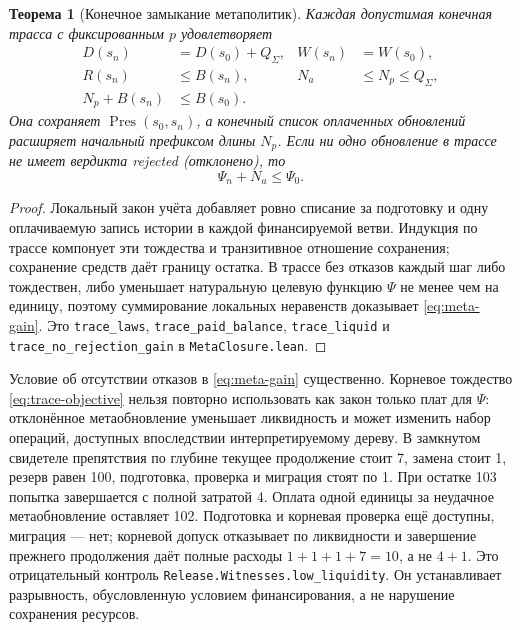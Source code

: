 \documentclass[10pt,a4paper]{article}
\newtheorem{theorem}{Теорема}[section]
\newcommand{\Pres}{\operatorname{Pres}}
\newcommand{\rc}[1]{\allowbreak\texttt{#1}\allowbreak}
\begin{document}
\begin{theorem}[Конечное замыкание метаполитик]\label{thm:meta-closure}
Каждая допустимая конечная трасса с фиксированным $p$ удовлетворяет
\begin{align}
 D(s_n)&=D(s_0)+Q_\Sigma,& W(s_n)&=W(s_0),\\
 R(s_n)&\le B(s_n),& N_a&\le N_p\le Q_\Sigma,\\
 N_p+B(s_n)&\le B(s_0).
\end{align}
Она сохраняет $\Pres(s_0,s_n)$, а конечный список оплаченных обновлений расширяет начальный префиксом длины $N_p$. Если ни одно обновление в трассе не имеет вердикта \emph{rejected} (отклонено), то
\begin{equation}\label{eq:meta-gain}
 \Psi_n+N_a\le\Psi_0.
\end{equation}
\end{theorem}
\begin{proof}
Локальный закон учёта добавляет ровно списание за подготовку и одну оплачиваемую запись истории в каждой финансируемой ветви. Индукция по трассе компонует эти тождества и транзитивное отношение сохранения; сохранение средств даёт границу остатка. В трассе без отказов каждый шаг либо тождествен, либо уменьшает натуральную целевую функцию $\Psi$ не менее чем на единицу, поэтому суммирование локальных неравенств доказывает \eqref{eq:meta-gain}. Это \rc{trace\_laws}, \rc{trace\_paid\_balance}, \rc{trace\_liquid} и \rc{trace\_no\_rejection\_gain} в \rc{MetaClosure.lean}.
\end{proof}

Условие об отсутствии отказов в \eqref{eq:meta-gain} существенно. Корневое тождество \eqref{eq:trace-objective} нельзя повторно использовать как закон только плат для $\Psi$: отклонённое метаобновление уменьшает ликвидность и может изменить набор операций, доступных впоследствии интерпретируемому дереву. В замкнутом свидетеле препятствия по глубине текущее продолжение стоит 7, замена стоит 1, резерв равен 100, подготовка, проверка и миграция стоят по 1. При остатке 103 попытка завершается с полной затратой 4. Оплата одной единицы за неудачное метаобновление оставляет 102. Подготовка и корневая проверка ещё доступны, миграция --- нет; корневой допуск отказывает по ликвидности и завершение прежнего продолжения даёт полные расходы $1+1+1+7=10$, а не $4+1$. Это отрицательный контроль \rc{Release.Witnesses.low\_liquidity}. Он устанавливает разрывность, обусловленную условием финансирования, а не нарушение сохранения ресурсов.
\end{document}
